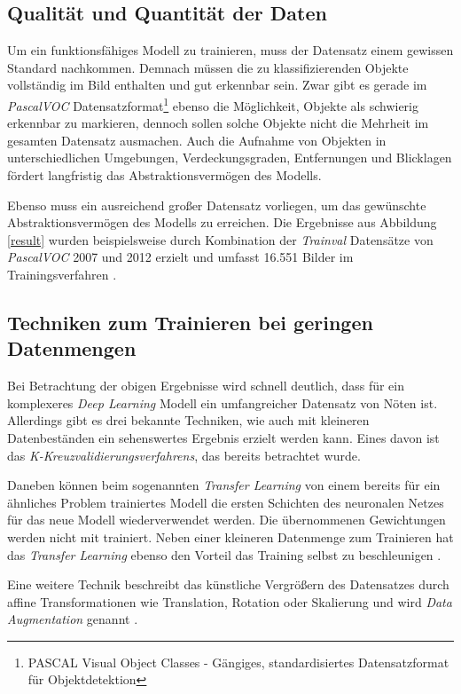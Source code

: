 \subsection*{Qualität und Quantität der Daten}

Um ein funktionsfähiges Modell zu trainieren, muss der Datensatz einem gewissen Standard nachkommen. Demnach müssen die zu klassifizierenden Objekte vollständig im Bild enthalten und gut erkennbar sein. Zwar gibt es gerade im \textit{PascalVOC} Datensatzformat\footnote{PASCAL Visual Object Classes - Gängiges, standardisiertes Datensatzformat für Objektdetektion} ebenso die Möglichkeit, Objekte als \glqq schwierig erkennbar\grqq{} zu markieren, dennoch sollen solche Objekte nicht die Mehrheit im gesamten Datensatz ausmachen. Auch die Aufnahme von Objekten in unterschiedlichen Umgebungen, Verdeckungsgraden, Entfernungen und Blicklagen fördert langfristig das Abstraktionsvermögen des Modells. 

Ebenso muss ein ausreichend großer Datensatz vorliegen, um das gewünschte Abstraktionsvermögen des Modells zu erreichen. Die Ergebnisse aus Abbildung \ref{result} wurden beispielsweise durch Kombination der \textit{Trainval} Datensätze von \textit{PascalVOC} 2007 und 2012 erzielt und umfasst 16.551 Bilder im Trainingsverfahren \cite{ssd.20161229, MarkEveringham.20070607, MarkEveringham.20120521}. 

\subsection*{Techniken zum Trainieren bei geringen Datenmengen}

Bei Betrachtung der obigen Ergebnisse wird schnell deutlich, dass für ein komplexeres \textit{Deep Learning} Modell ein umfangreicher Datensatz von Nöten ist. Allerdings gibt es drei bekannte Techniken, wie auch mit kleineren Datenbeständen ein sehenswertes Ergebnis erzielt werden kann. Eines davon ist das \textit{K-Kreuzvalidierungsverfahrens}, das bereits betrachtet wurde.

Daneben können beim sogenannten \textit{Transfer Learning} von einem bereits für ein ähnliches Problem trainiertes Modell die ersten Schichten des neuronalen Netzes für das neue Modell wiederverwendet werden. Die übernommenen Gewichtungen werden nicht mit trainiert. Neben einer kleineren Datenmenge zum Trainieren hat das \textit{Transfer Learning} ebenso den Vorteil das Training selbst zu beschleunigen \cite{AurelienGeron.2018}.

Eine weitere Technik beschreibt das künstliche Vergrößern des Datensatzes durch affine Transformationen wie Translation, Rotation oder Skalierung und wird \textit{Data Augmentation} genannt \cite{AurelienGeron.2018}.
